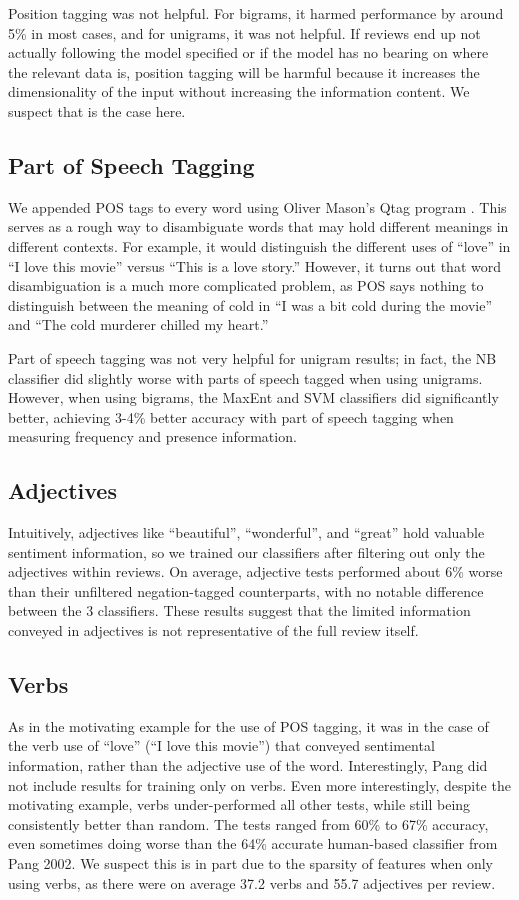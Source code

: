 \documentclass[10pt,twocolumn,letterpaper]{article}
\begin{document}
Position tagging was not helpful. For bigrams, it harmed performance by around 5\% in most cases, and for unigrams, it was not helpful. If reviews end up not actually following the model specified or if the model has no bearing on where the relevant data is, position tagging will be harmful because it increases the dimensionality of the input without increasing the information content. We suspect that is the case here.

\subsection{Part of Speech Tagging}

We appended POS tags to every word using Oliver Mason's Qtag program \cite{qtag}. This serves as a rough way to disambiguate words that may hold different meanings in different contexts. For example, it would distinguish the different uses of “love” in ``I love this movie'' versus ``This is a love story.'' However, it turns out that word disambiguation is a much more complicated problem, as POS says nothing to distinguish between the meaning of cold in ``I was a bit cold during the movie'' and ``The cold murderer chilled my heart.''

Part of speech tagging was not very helpful for unigram results; in fact, the NB classifier did slightly worse with parts of speech tagged when using unigrams. However, when using bigrams, the MaxEnt and SVM classifiers did significantly better, achieving 3-4\% better accuracy with part of speech tagging when measuring frequency and presence information.

\subsection{Adjectives}
Intuitively, adjectives like ``beautiful'', ``wonderful'', and ``great'' hold valuable sentiment information, so we trained our classifiers after filtering out only the adjectives within reviews. On average, adjective tests performed about 6\% worse than their unfiltered negation-tagged counterparts, with no notable difference between the 3 classifiers. These results suggest that the limited information conveyed in adjectives is not representative of the full review itself.


\subsection{Verbs}
As in the motivating example for the use of POS tagging, it was in the case of the verb use of ``love'' (``I love this movie'') that conveyed sentimental information, rather than the adjective use of the word. Interestingly, Pang did not include results for training only on verbs. Even more interestingly, despite the motivating example, verbs under-performed all other tests, while still being consistently better than random. The tests ranged from 60\% to 67\% accuracy, even sometimes doing worse than the 64\% accurate human-based classifier from Pang 2002. We suspect this is in part due to the sparsity of features when only using verbs, as there were on average 37.2 verbs and 55.7 adjectives per review.
\end{document}
